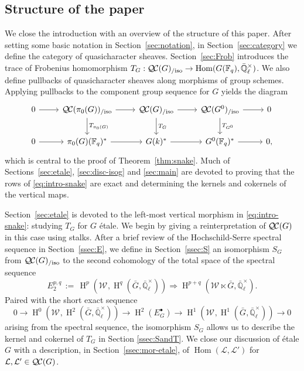 \documentclass{amsart}
\theoremstyle{plain}
\theoremstyle{definition}
\theoremstyle{remark}
\newcommand{\FF}{{\mathbb{F}}}
\newcommand{\EE}{\mathbb{\bar Q}_\ell}
\newcommand{\Fq}{k}
\newcommand{\EEx}{\EE^\times}
\newcommand{\Weil}[1]{\mathcal{W}_{#1}}
\DeclareMathOperator{\Hom}{Hom}
\DeclareMathOperator{\Hh}{H}
\newcommand{\ceq}{{\, :=\, }}
\newcommand{\TrFrob}[1]{T_{#1}}
\newcommand{\qcs}[1]{{\mathcal{#1}}}
\newcommand{\QC}{{\mathcal{Q\hskip-0.8pt C}}}
\newcommand{\QCiso}[1]{\QC(#1)_{/\text{iso}}}
\newcommand{\bG}{\bar{G}}
\begin{document}
\subsection{Structure of the paper}

We close the introduction with an overview of the structure of this paper.
After setting some basic notation in Section~\ref{sec:notation},
in Section~\ref{sec:category} we define the category of quasicharacter sheaves.
Section~\ref{sec:Frob} introduces the trace of Frobenius homomorphism $\TrFrob{G} : \QCiso{G} \to \Hom(G(\FF_q), \EEx)$.
We also define pullbacks of quasicharacter sheaves along morphisms of group schemes.  Applying pullbacks to the component group
sequence for $G$ yields the diagram
 \begin{equation} \label{eq:intro-snake}
  \begin{tikzcd}[row sep=20]
    0 \rar & \QCiso{\pi_0(G)} \rar \dar{\TrFrob{\pi_0(G)}}
    & \QCiso{G} \rar \dar{\TrFrob{G}} & \QCiso{G^0} \rar \dar{\TrFrob{G^0}} & 0\\
    0 \rar & \pi_0(G)(\FF_q)^* \rar & G(\Fq)^* \rar & G^0(\FF_q)^* \rar & 0,
  \end{tikzcd}
  \end{equation}
which is central to the proof of Theorem~\ref{thm:snake}.  Much of Sections~\ref{sec:etale}, \ref{sec:disc-isog} and \ref{sec:main}
are devoted to proving that the rows of \eqref{eq:intro-snake} are exact and determining the kernels and cokernels of the vertical maps.

Section~\ref{sec:etale} is devoted to the left-most vertical morphism in \eqref{eq:intro-snake}: studying $\TrFrob{G}$ for $G$ \'etale.  We begin by giving a reinterpretation of
$\QC(G)$ in this case using stalks.  After a brief review of the Hochschild-Serre spectral sequence in Section~\ref{ssec:E},
we define in Section~\ref{ssec:S} an isomorphism $S_G$ from $\QCiso{G}$ to the second cohomology of the total space of the spectral sequence
\[
E_2^{p,q} \ceq \Hh^p(\Weil{}, \Hh^q(\bG, \EEx)) \Rightarrow \Hh^{p+q}(\Weil{} \ltimes \bG, \EEx).
\]
Paired with the short exact sequence
\[
  0 \to \Hh^0(\Weil{},\Hh^2({\bar G},\EEx)) \to \Hh^2(E^\bullet_G) \to \Hh^1(\Weil{},\Hh^1({\bar G},\EEx)) \to 0
\]
arising from the spectral sequence, the isomorphism $S_G$ allows us to describe the kernel and cokernel of $\TrFrob{G}$ in Section \ref{ssec:SandT}.
We close our discussion of \'etale $G$ with a description, in Section~\ref{ssec:mor-etale}, of $\Hom(\qcs{L},\qcs{L}')$ for $\qcs{L}, \qcs{L}' \in \QC(G)$.
\end{document}
